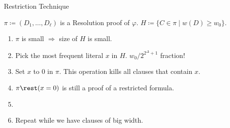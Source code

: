 \begin{frame}{Restriction Technique}
    
    $\pi \coloneqq (D_1, \dots, D_{\ell})$ is a Resolution proof of $\varphi$. $H \coloneqq \{C \in \pi
    \mid w(D) \ge w_0 \}$.

    \begin{enumerate}
        \item $\pi$ is small $\Rightarrow$ size of $H$ is small.
        \pause
        \item Pick the most frequent literal $x$ in $H$. \alert{$w_0 / 2^{2^{\Delta} + 1}$ fraction!}
        \pause
        \item Set $x$ to $0$ in $\pi$. This operation kills all clauses that contain $x$.
        \pause
        \item $\pi \rest (x = 0)$ is still a proof of a restricted formula.
            \pause
        \item {}
        \pause
        \pause    
        \item Repeat while we have clauses of big width.
    \end{enumerate}


\end{frame}
